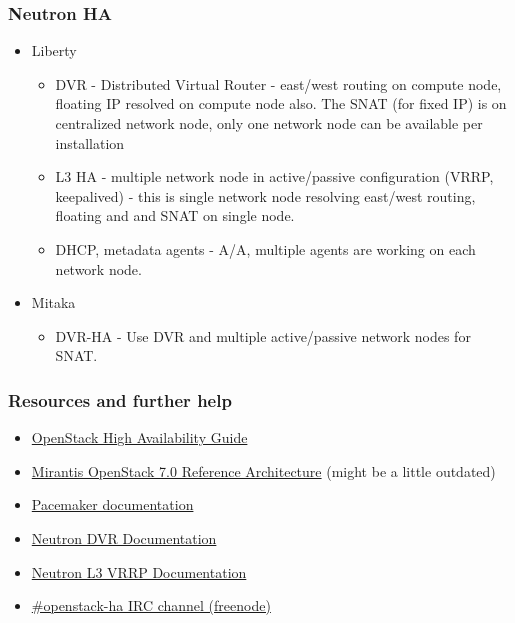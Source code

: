 \documentclass[aspectratio=43]{beamer}
\begin{document}
\begin{frame}
    \frametitle{Neutron HA}
    \begin{itemize}
        \item Liberty
        \begin{itemize}
	        \item DVR - Distributed Virtual Router - east/west routing on compute node, floating IP resolved on compute node also. The SNAT (for fixed IP) is on centralized network node, only one network node can be available per installation
	        \item L3 HA - multiple network node in active/passive configuration (VRRP, keepalived) - this is single network node resolving east/west routing, floating and and SNAT on single node.
	        \item DHCP, metadata agents - A/A, multiple agents are working on each network node.
	    \end{itemize}
        \item Mitaka
        \begin{itemize}
            \item DVR-HA - Use DVR and multiple active/passive network nodes for SNAT.
        \end{itemize}
    \end{itemize}
\end{frame}

\begin{frame}
    \frametitle{Resources and further help}
    \begin{itemize}
        \item \href{http://docs.openstack.org/ha-guide/}{OpenStack High Availability Guide}
        \item \href{https://docs.mirantis.com/openstack/fuel/fuel-7.0/reference-architecture.html}{Mirantis OpenStack 7.0 Reference Architecture} (might be a little outdated)
        \item \href{http://clusterlabs.org/}{Pacemaker documentation}
        \item \href{http://docs.openstack.org/mitaka/networking-guide/scenario-dvr-ovs.html}{Neutron DVR Documentation}
        \item \href{http://docs.openstack.org/mitaka/networking-guide/scenario-l3ha-ovs.html}{Neutron L3 VRRP Documentation}
        \item \href{irc://chat.freenode.net/openstack-ha}{\#openstack-ha IRC channel (freenode)}
    \end{itemize}
\end{frame}
\end{document}
